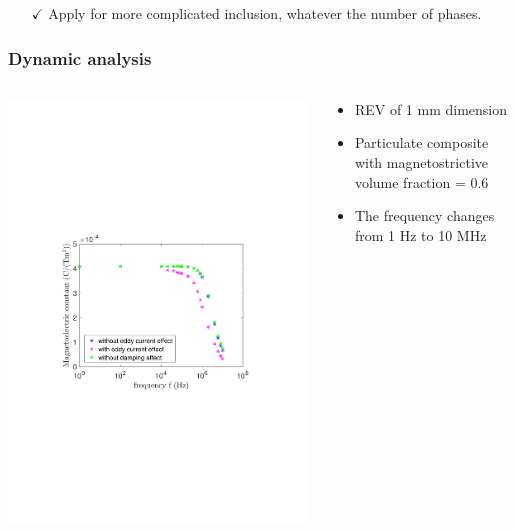 \documentclass[compress]{beamer}
\begin{document}
\begin{frame}
\begin{block}{}
\begin{itemize}[leftmargin=*]
	\item[{\color{green} $\checkmark$}] Apply for  more complicated inclusion, whatever the number of phases.
	\end{itemize}
\end{block}		
\end{frame}

\begin{frame}\frametitle{Dynamic analysis}
\begin{columns}[totalwidth=\textwidth]
	\begin{column}{.75\textwidth}
\includegraphics[width=0.99\textwidth]{Graphic/04_cubeeddyeffect.pdf}
\end{column}
\begin{column}{.25\textwidth}
\begin{itemize}[label=$\bullet$, font=\small, leftmargin=*]
	\item REV of 1 mm dimension
	\item Particulate composite with magnetostrictive volume fraction = 0.6
	\item The frequency changes from  1 Hz to 10 MHz 
	\end{itemize}
\end{column}
\end{columns}
\end{frame}
\end{document}
